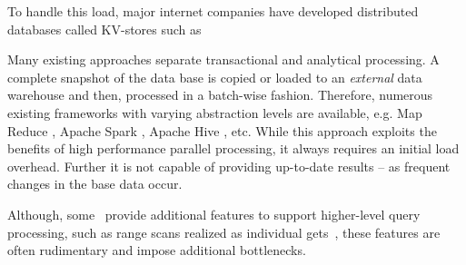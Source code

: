 
To handle 
this load, major internet companies have developed distributed 
databases called KV-stores such as

Many existing approaches separate transactional and analytical 
processing. A complete snapshot of the data base is copied or loaded to 
an \textit{external} data warehouse and then, processed in a batch-wise 
fashion. Therefore, numerous existing frameworks with varying 
abstraction levels are available, e.g. Map Reduce \cite{dean:mapreduce}, 
Apache Spark \cite{zaharia:spark}, Apache Hive \cite{thusoo:hive}, etc. 
While this approach exploits the benefits of high performance parallel 
processing, it always requires an initial load overhead. Further it is 
not capable of providing up-to-date results -- as frequent changes in 
the base data occur. 


%
%
Although, some \KVSs\ provide additional features to support
higher-level query processing, such as range scans realized as
individual gets~\cite{cooper:pnuts}, these features are often
rudimentary and impose additional bottlenecks.



